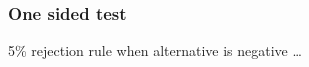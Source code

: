 \documentclass[handout]{beamer}
\begin{document}


   \begin{frame}
   \frametitle{One sided test}
   \begin{center}
   \end{center}
   {\color{blue} 5\% rejection rule} when alternative is negative \dots
   \end{frame}

\end{document}
